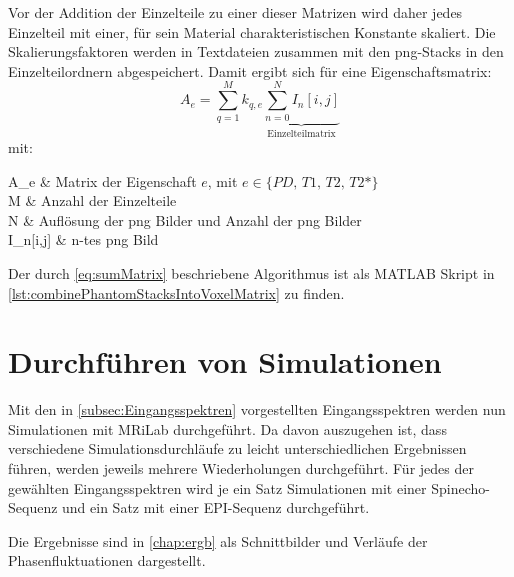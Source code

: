 Vor der Addition der Einzelteile zu einer dieser Matrizen wird daher jedes Einzelteil mit einer, für sein Material charakteristischen Konstante skaliert. Die Skalierungsfaktoren werden in Textdateien zusammen mit den png-Stacks in den Einzelteilordnern abgespeichert. Damit ergibt sich für eine Eigenschaftsmatrix:
\begin{equation}
\label{eq:sumMatrix}
	A_e=\sum_{q=1}^{M} k_{q,e} \underbrace{\sum_{n=0}^{N} I_n[i,j]}_\text{Einzelteilmatrix}
\end{equation}
mit:
\begin{with*}
	A_e & Matrix der Eigenschaft $e$, mit $e \in \{PD,\, T1,\, T2,\, T2\text{*}\}$ \\
	M & Anzahl der Einzelteile \\
	N & Auflösung der png Bilder und Anzahl der png Bilder \\
	I_n[i,j] & n-tes png Bild \\
\end{with*}

Der durch \autoref{eq:sumMatrix} beschriebene Algorithmus ist als MATLAB Skript in \autoref{lst:combinePhantomStacksIntoVoxelMatrix} zu finden.

\section{Durchführen von Simulationen}
Mit den in \autoref{subsec:Eingangsspektren} vorgestellten Eingangsspektren werden nun Simulationen mit MRiLab durchgeführt. Da davon auszugehen ist, dass verschiedene Simulationsdurchläufe zu leicht unterschiedlichen Ergebnissen führen, werden jeweils mehrere Wiederholungen durchgeführt. Für jedes der gewählten Eingangsspektren wird je ein Satz Simulationen mit einer Spinecho-Sequenz und ein Satz mit einer EPI-Sequenz durchgeführt.

Die Ergebnisse sind in \autoref{chap:ergb} als Schnittbilder und Verläufe der Phasenfluktuationen dargestellt.










